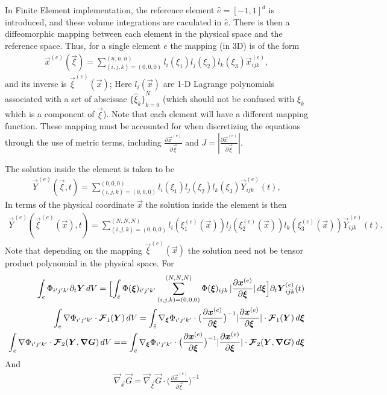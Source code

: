 \documentclass{report}
\numberwithin{equation}{section}
\begin{document}
In Finite Element implementation, the reference element $\hat{e} = {[-1, 1]}^d$ is introduced, and these volume integrations are caculated in $\hat{e}$.
There is then a diffeomorphic mapping between each element in
the physical space and the reference space. Thus, for a single element $e$ the
mapping (in 3D) is of the form 
\begin{align}
    \vec{x}^{(e)}(\vec{\xi}) = \sum_{(i,j,k) = (0,0,0)}^{(n,n,n)}
  l_{i}(\xi_{1}) l_{j}(\xi_{2}) l_{k}(\xi_{3})
  \vec{x}_{ijk}^{(e)},
\end{align}
and its inverse is $\vec{\xi}^{(e)}(\vec{x})$; 
Here $l_{i}(\vec{x})$ are 1-D Lagrange polynomials associated with a set of
abscissae ${\{\hat{\xi}_{k}\}}_{k=0}^{N}$ (which should not be confused with
$\xi_{k}$ which is a component of $\vec{\xi}$).
Note that each element will have a different mapping
function. These mapping must be accounted for when discretizing the equations
through the use of metric terms, including $ \frac{\partial \vec{x}^{(e)}  }{\partial \vec{\xi}}$ and $J = | \frac{\partial \vec{x}^{(e)}  }{\partial \vec{\xi}} |$.




The solution inside the element is taken to be
\begin{align}
  \vec{Y}^{(e)}(\vec{\xi}, t) = \sum_{(i,j,k) = (0,0,0)}^{(0,0,0)}
  l_{i}(\xi_{1}) l_{j}(\xi_{2}) l_{k}(\xi_{3})
  \vec{Y}_{ijk}^{(e)}(t),
\end{align}
In terms of the physical
coordinate $\vec{x}$ the solution inside the element is then
\begin{align}
  \vec{Y}^{(e)}(\vec{\xi}^{(e)}(\vec{x}), t) = \sum_{(i,j,k) = (0,0,0)}^{(N,N,N)}
  l_{i}(\xi_{1}^{(e)}(\vec{x})) l_{j}(\xi_{2}^{(e)}(\vec{x}))
  l_{k}(\xi_{3}^{(e)}(\vec{x}))
  \vec{Y}_{ijk}^{(e)}(t).
\end{align}
Note that depending on the mapping $\vec{\xi}^{(e)}(\vec{x})$ the solution need
not be tensor product polynomial in the physical space.
For 
\begin{align}
\int_e \Phi_{i'j'k'}\partial_t \boldsymbol{{Y}} \, dV  =  \Bigl[\int_{\hat{e}} \Phi(\boldsymbol{{\xi}})_{i'j'k'}  \sum_{(i,j,k) = (0,0,0)}^{(N,N,N)}
  \Phi(\boldsymbol{{\xi}})_{ijk} \, | \frac{\partial \boldsymbol{{x}}^{(e)}  }{\partial \boldsymbol{{\xi}}} | \, d\boldsymbol{{\xi}}\Bigr] \partial_t \boldsymbol{{Y}}_{ijk}^{(e)}(t) \\
\int_e \nabla \Phi_{i'j'k'} \cdot \boldsymbol{{\mathcal{F}}}_1(\boldsymbol{{Y}}) \, dV = \int_{\hat{e}} \nabla_{\boldsymbol{{\xi}}} \Phi_{i'j'k'} \cdot \bigl( \frac{\partial \boldsymbol{{x}}^{(e)}  }{\partial \boldsymbol{{\xi}}} \bigr)^{-1} | \frac{\partial \boldsymbol{{x}}^{(e)}  }{\partial \boldsymbol{{\xi}}} | \cdot \boldsymbol{{\mathcal{F}}}_1(\boldsymbol{{Y}}) \, d\boldsymbol{{\xi}}\\
\int_e \nabla \Phi_{i'j'k'} \cdot \boldsymbol{{\mathcal{F}}}_2(\boldsymbol{{Y}}, \boldsymbol{{\nabla}} \boldsymbol{{G}}) \, dV = = \int_{\hat{e}} \nabla_{\boldsymbol{{\xi}}} \Phi_{i'j'k'} \cdot \bigl( \frac{\partial \boldsymbol{{x}}^{(e)}  }{\partial \boldsymbol{{\xi}}} \bigr)^{-1} | \frac{\partial \boldsymbol{{x}}^{(e)}  }{\partial \boldsymbol{{\xi}}} | \cdot \boldsymbol{{\mathcal{F}}}_2(\boldsymbol{{Y}}, \boldsymbol{{\nabla}} \boldsymbol{{G}}) \, d\boldsymbol{{\xi}}
\end{align}
And 
\begin{align}
    \vec \nabla_{\vec x} \vec G = \vec \nabla_{\vec \xi} \vec G \cdot \bigl( \frac{\partial \vec{x}^{(e)}  }{\partial \vec{\xi}} \bigr)^{-1} 
\end{align}
\end{document}

